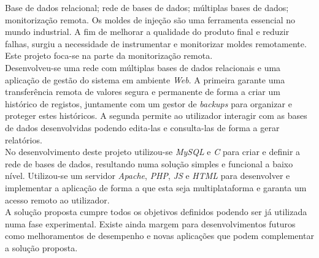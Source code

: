 \documentclass[11pt,twoside,a4paper]{report}
\begin{document}
\TitlePage
  \vspace*{55mm}
       {Base de dados relacional; rede de bases de dados; múltiplas bases de dados; monitorização remota.}
       {Os moldes de injeção são uma ferramenta essencial no mundo industrial. A fim de melhorar a qualidade do produto final e reduzir falhas, surgiu a necessidade de instrumentar e monitorizar moldes remotamente. Este projeto foca-se na parte da monitorização remota.\\
       Desenvolveu-se uma rede com múltiplas bases de dados relacionais e uma aplicação de gestão do sistema em ambiente \textit{Web}. A primeira garante uma transferência remota de valores segura e permanente de forma a criar um histórico de registos, juntamente com um gestor de \textit{backups} para organizar e proteger estes históricos. A segunda permite ao utilizador interagir com as bases de dados desenvolvidas podendo edita-las e consulta-las de forma a gerar relatórios.\\
       No desenvolvimento deste projeto utilizou-se \textit{MySQL} e \textit{C} para criar e definir a rede de bases de dados, resultando numa solução simples e funcional a baixo nível. Utilizou-se um servidor \textit{Apache}, \textit{PHP}, \textit{JS} e \textit{HTML} para desenvolver e implementar a aplicação de forma a que esta seja multiplataforma e garanta um acesso remoto ao utilizador.\\
       A solução proposta cumpre todos os objetivos definidos podendo ser já utilizada numa fase experimental. Existe ainda margem para desenvolvimentos futuros como melhoramentos de desempenho e novas aplicações que podem complementar a solução proposta.}
\EndTitlePage
\titlepage\ \endtitlepage %
\end{document}
